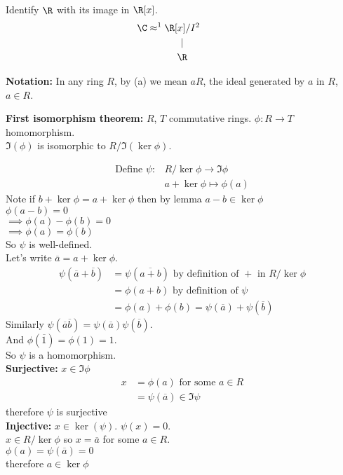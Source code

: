 Identify $\R$ with its image in $\R[x]$.
\begin{gather*}
\text{\llap{$\C \mathrel{{\approx}\footnotemark}{}$}} \R[x]/I\footnotemark \\ %
| \\
\R
\end{gather*}\addtocounter{footnote}{-1}\addtocounter{footnote}{1}%
%
\textbf{Notation:} In any ring $R$, by (a) we mean $aR$, the ideal generated by $a$ in $R$, $a\in R$.

\textbf{First isomorphism theorem:} $R$, $T$ commutative rings.  $\phi\colon R\to T$ homomorphism. \\
$\Im(\phi)$ is isomorphic to $R/\Im(\ker\phi)$.

\pf
\begin{align*}
\text{Define } \psi\colon & R/\ker\phi \to \Im\phi \\
& a + \ker\phi \mapsto \phi(a)
\end{align*}
Note if $b+\ker\phi=a+\ker\phi$ then by lemma $a-b\in\ker\phi$ \\
$\phi(a-b)=0$ \\
$\implies \phi(a)-\phi(b)=0$ \\
$\implies \phi(a)=\phi(b)$ \\
So $\psi$ is well-defined. \\
Let's write $\overline a=a+\ker\phi$.
\begin{align*}
\psi(\overline a+\overline b) &= \psi(\overline{a+b}) \text{ by definition of $+$ in $R/\ker\phi$} \\
&=\phi(a+b) \text{ by definition of $\psi$} \\
&=\phi(a)+\phi(b)=\psi(\overline a)+\psi(\overline b)
\end{align*}
Similarly $\psi(\overline a\overline b)=\psi(\overline a)\psi(\overline b)$. \\
And $\phi(\overline1)=\phi(1)=1$. \\
So $\psi$ is a homomorphism. \\
\textbf{Surjective:} $x\in\Im\phi$
\begin{align*}
x &= \phi(a)\text{ for some $a\in R$} \\
&= \psi(\overline a) \in \Im\psi
\end{align*}
therefore $\psi$ is surjective \\
\textbf{Injective:} $x\in\ker(\psi)$. $\psi(x)=0$. \\
$x\in R/\ker\phi$ so $x=\overline a$ for some $a\in R$. \\
$\phi(a)=\psi(\overline a)=0$ \\
therefore $a\in\ker\phi$

